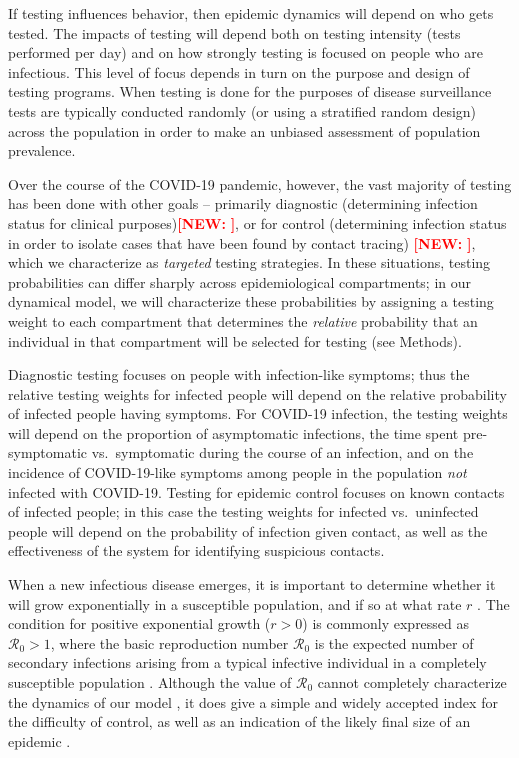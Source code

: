 \documentclass[12pt]{article}
\newcommand{\Rnum}{\ensuremath{\mathcal{R}_0}\xspace}
\newcommand{\covid}{COVID-19\xspace}
\DeclareRobustCommand\_{\ifmmode\expandafter\subtxt\else\textunderscore\fi}
\newcommand{\comment}{\showcomment}
\newcommand{\showcomment}[3]{\textcolor{#1}{\textbf{[#2: }\textsl{#3}\textbf{]}}}
\newcommand{\new}[1]{\comment{red}{NEW}{#1}}
\theoremstyle{definition} %
\begin{document}
If testing influences behavior, then epidemic dynamics will depend on who gets tested.
The impacts of testing will depend both on testing intensity (tests performed per day) and on how strongly testing is focused on people who are infectious.
This level of focus depends in turn on the purpose and design of testing programs. 
When testing is done for the purposes of disease surveillance \citep{foddai2020base}
tests are typically conducted randomly (or using a stratified random design) across the population in order to make an unbiased assessment of population prevalence.

Over the course of the \covid pandemic, however, the vast majority of testing has been done with other goals --
primarily diagnostic (determining infection status for clinical purposes)\new{\citep{phua2020intensive,who2020global}}, or for control (determining  infection status in order to isolate cases that have been found by contact tracing) \new{\citep{aleta2020modelling,kucharski2020effectiveness,grassly2020comparison,smith2020adherence}}, which we characterize as \emph{targeted} testing strategies.
In these situations, testing probabilities can differ sharply across epidemiological compartments; in our dynamical model, we will characterize these probabilities by assigning a testing weight to each compartment that determines the \emph{relative} probability that an individual in that compartment will be selected for testing (see Methods). 

Diagnostic testing focuses on people with infection-like symptoms; thus the relative testing weights for infected people will depend on the relative probability of infected people having symptoms. For \covid infection, the testing weights will depend on the proportion of asymptomatic infections, the time spent pre-symptomatic vs.\ symptomatic during the course of an infection, and on the incidence of \covid-like symptoms among people in the population \emph{not} infected with \covid. Testing for epidemic control focuses on known contacts of infected people; in this case the testing weights for infected vs.\ uninfected people will depend on the probability of infection given contact, as well as the effectiveness of the system for identifying suspicious contacts.

When a new infectious disease emerges, it is important to determine whether it will grow exponentially in a susceptible population, and if so at what rate $r$ \citep{Ma+14}.  The condition for positive exponential growth ($r>0$) is commonly expressed as $\Rnum>1$, where the basic reproduction number $\Rnum$ is the expected number of secondary infections arising from a typical infective individual in a completely susceptible population \citep{dietz1993estimation}.  Although the value of $\Rnum$ cannot completely characterize the dynamics of our model \citep{shaw2021what}, it does give a simple and widely accepted index for the difficulty of control, as well as an indication of the likely final size of an epidemic \citep{ma2006generality,miller2012note}.
\end{document}
